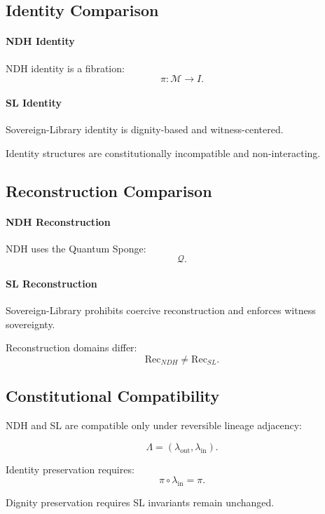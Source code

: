 
\subsection{Identity Comparison}

\paragraph{NDH Identity}
NDH identity is a fibration:
\[
\pi : \mathcal{M} \to I.
\]

\paragraph{SL Identity}
Sovereign-Library identity is dignity-based and witness-centered.

Identity structures are constitutionally incompatible and non-interacting.


\subsection{Reconstruction Comparison}

\paragraph{NDH Reconstruction}
NDH uses the Quantum Sponge:
\[
\mathcal{Q}.
\]

\paragraph{SL Reconstruction}
Sovereign-Library prohibits coercive reconstruction and enforces witness
sovereignty.

Reconstruction domains differ:
\[
\mathrm{Rec}_{NDH} \neq \mathrm{Rec}_{SL}.
\]


\subsection{Constitutional Compatibility}

NDH and SL are compatible only under reversible lineage adjacency:

\[
\Lambda = (\lambda_{\mathrm{out}}, \lambda_{\mathrm{in}}).
\]

Identity preservation requires:
\[
\pi \circ \lambda_{\mathrm{in}} = \pi.
\]

Dignity preservation requires SL invariants remain unchanged.

